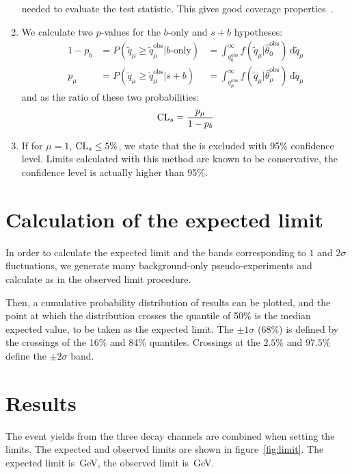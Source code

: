 \begin{enumerate}
        needed to evaluate the test statistic.
        This gives good coverage properties~\cite{2006sppp.conf..112C}.
    \item We calculate two $p$-values for the $b$-only and $s+b$ hypotheses:
        \begin{align*}
            1 - p_b &= P(\tilde{q}_\mu \geq \tilde{q}_\mu^{\text{obs}} |
            b \text{-only}) &= \int_{q_{0}^{\text{obs}}}^\infty
            f(\tilde{q}_\mu|\hat{\theta}_{0}^{\text{obs}}) \mathrm{\,d}
            \tilde{q}_\mu\\
            p_\mu &= P(\tilde{q}_\mu \geq \tilde{q}_\mu^{\text{obs}} | s+b)
            &= \int_{q_{\mu}^{\text{obs}}}^\infty
            f(\tilde{q}_\mu|\hat{\theta}_{\mu}^{\text{obs}}) \mathrm{\,d}
            \tilde{q}_\mu
        \end{align*}
        and \CLs as the ratio of these two probabilities:
        \begin{equation*}
            \mathrm{CL}_{s} = \dfrac{p_\mu}{1 - p_b}
        \end{equation*}
    \item If for $\mu = 1$, $\mathrm{CL}_{s} \leq 5\%$, we state that the \TP is
        excluded with 95\% confidence level.
        Limits calculated with this \CLs method are known to be
        conservative, \ie the confidence level is actually higher than 95\%.
\end{enumerate}
\section{Calculation of the expected limit}
In order to calculate the expected limit and the bands corresponding to
$1$ and $2\sigma$ fluctuations, we generate many background-only
pseudo-experiments and calculate \CLs as in the observed limit procedure. 

Then, a cumulative probability distribution of results can be plotted, and
the point at which the distribution crosses the quantile of 50\% is the
median expected value, to be taken as the expected limit. The $\pm 1\sigma$
(68\%) is defined by the crossings of the 16\% and 84\% quantiles. Crossings
at the $2.5\%$ and $97.5\%$ define the $\pm 2\sigma$ band.

\section{Results}
The event yields from the three decay channels are
combined when setting the limits.
The expected and observed limits are shown in
figure~\ref{fig:limit}.
The expected limit is~\unit[658]{GeV}, the observed limit
is~\unit[633]{GeV}.

